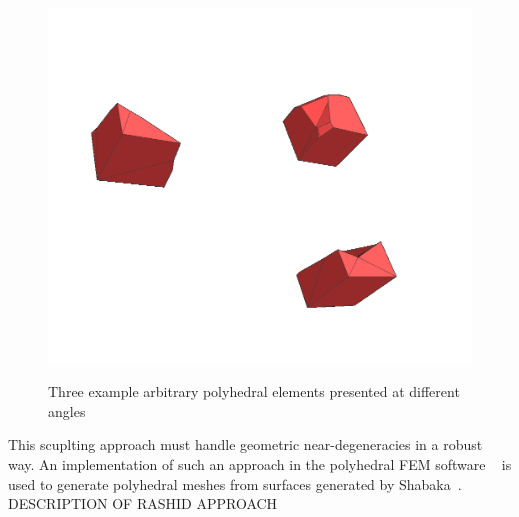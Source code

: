 \begin{figure}[htbp!]
{		\includegraphics[scale=0.125]{media/3-celeris/zoom/zoom5.png}
\label{fig:zoom5}}		
\caption{Three example arbitrary polyhedral elements presented at different angles}
\label{fig:zoom}
\end{figure}

This scuplting approach must handle geometric near-degeneracies in a robust way. An implementation of such an approach in the polyhedral FEM software ~\cite{Celeris} is used to generate polyhedral meshes from surfaces generated by Shabaka~\cite{rashid_2013}.
DESCRIPTION OF RASHID APPROACH

